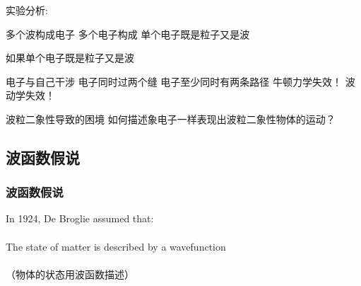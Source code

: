 \begin{frame}
    \frametitle{}
    实验分析:\\
    \begin{itemize}
        \Item 多个波构成电子 
        \Item 多个电子构成 
        \Item 单个电子既是粒子又是波 
    \end{itemize}
\end{frame}

\begin{frame}
    如果单个电子既是粒子又是波 \\
\begin{itemize}
    \Item  电子与自己干涉 
    \Item  电子同时过两个缝  
    \Item  电子至少同时有两条路径 
    \Item  牛顿力学失效！ 
    \Item  波动学失效！ 
\end{itemize}
\end{frame}

\begin{frame}
    \centering
    \begin{tcbb}[0.68]{波粒二象性导致的困境}
        {如何描述象电子一样表现出波粒二象性物体的运动？}
    \end{tcbb}
\end{frame}

\subsection{波函数假说}

\begin{frame}
    \frametitle{波函数假说}
    \begin{tcolorbox4}
    In 1924, De Broglie assumed that:\\
    ~\\
    The state of matter is described by a wavefunction \\
    ~\\
    （物体的状态用波函数描述）
    \end{tcolorbox4}
\end{frame}

